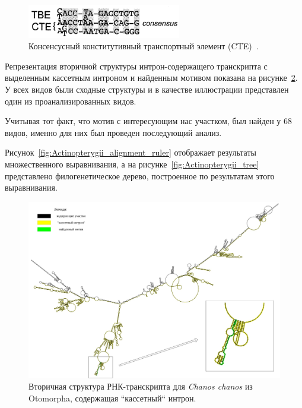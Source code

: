 \begin{figure}[H] %
    \centering
    \includegraphics[width=0.6\textwidth]{images/CTE_consensus}
    \caption{Консенсусный конститутивный транспортный элемент (CTE)~\cite{cte_consensus}.}
    \label{fig:CTE_consensus}
\end{figure}

Репрезентация вторичной структуры интрон-содержащего транскрипта с выделенным кассетным интроном и найденным мотивом показана на рисунке~\ref{fig:Chanos_chanos_2nd_structure}.
У всех видов были сходные структуры и в качестве иллюстрации представлен один из проанализированных видов.

Учитывая тот факт, что мотив с интересующим нас участком, был найден у 68 видов, именно для них был проведен последующий анализ.

Рисунок~\ref{fig:Actinopterygii_alignment_ruler} отображает результаты множественного выравнивания, а на рисунке~\ref{fig:Actinopterygii_tree} представлено филогенетическое дерево, построенное по результатам этого выравнивания.

\begin{figure}
    \centering
    \includegraphics[width=0.9\textheight]{images/Chanos_chanos_2nd_structure}
    \caption{Вторичная структура РНК-транскрипта для \textit{Chanos chanos} из Otomorpha, содержащая ``кассетный`` интрон.}
    \label{fig:Chanos_chanos_2nd_structure}
\end{figure}

